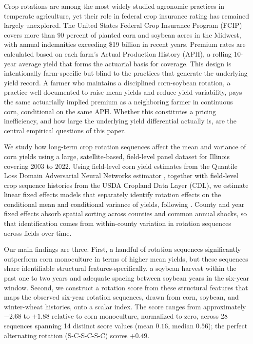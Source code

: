 \documentclass[12pt,letterpaper]{article}
\theoremstyle{remark}
\theoremstyle{remark}
\theoremstyle{plain}
\theoremstyle{definition}
\begin{document}
Crop rotations are among the most widely studied agronomic practices in temperate agriculture, yet their role in federal crop insurance rating has remained largely unexplored. The United States Federal Crop Insurance Program (FCIP) covers more than 90 percent of planted corn and soybean acres in the Midwest, with annual indemnities exceeding \$19 billion in recent years. Premium rates are calculated based on each farm's Actual Production History (APH), a rolling 10-year average yield that forms the actuarial basis for coverage. This design is intentionally farm-specific but blind to the practices that generate the underlying yield record. A farmer who maintains a disciplined corn-soybean rotation, a practice well documented to raise mean yields and reduce yield variability, pays the same actuarially implied premium as a neighboring farmer in continuous corn, conditional on the same APH. Whether this constitutes a pricing inefficiency, and how large the underlying yield differential actually is, are the central empirical questions of this paper.
 
We study how long-term crop rotation sequences affect the mean and variance of corn yields using a large, satellite-based, field-level panel dataset for Illinois covering 2003 to 2022. Using field-level corn yield estimates from the Quantile Loss Domain Adversarial Neural Networks estimator \citep[QDANN;][]{Ma2024}, together with field-level crop sequence histories from the USDA Cropland Data Layer (CDL), we estimate linear fixed effects models that separately identify rotation effects on the conditional mean and conditional variance of yields, following \citet{Just1979}. County and year fixed effects absorb spatial sorting across counties and common annual shocks, so that identification comes from within-county variation in rotation sequences across fields over time.
 
Our main findings are three. First, a handful of rotation sequences significantly outperform corn monoculture in terms of higher mean yields, but these sequences share identifiable structural features-specifically, a soybean harvest within the past one to two years and adequate spacing between soybean years in the six-year window. Second, we construct a rotation score from these structural features that maps the observed six-year rotation sequences, drawn from corn, soybean, and winter-wheat histories, onto a scalar index. The score ranges from approximately $-2.68$ to $+1.88$ relative to corn monoculture, normalized to zero, across 28 sequences spanning 14 distinct score values (mean $0.16$, median $0.56$); the perfect alternating rotation (S-C-S-C-S-C) scores $+0.49$. %
\end{document}
